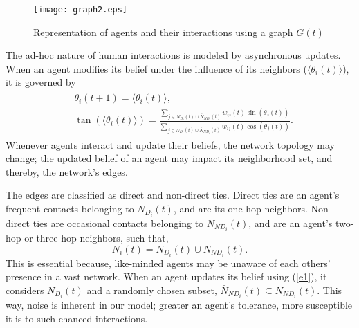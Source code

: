 \documentclass[letterpaper,english,11pt]{article}
\begin{document}
\begin{figure}[t!]	
	\centering
	\texttt{[image: graph2.eps]}
	\vspace{-5pt}
	\caption{Representation of agents and their interactions using a graph $G(t)$}	
	\label{fig2b}\vspace{-15pt}
\end{figure}

The ad-hoc nature of human interactions is modeled by asynchronous updates. When an agent modifies its belief under the influence of its neighbors ($\langle \theta_{i}(t)\rangle$), it is governed by 
\begin{align}\label{e1}
\begin{split}
&\theta_{i}(t+1) = \langle \theta_{i}(t)\rangle,\\ 
& \tan(\langle \theta_{i}(t)\rangle)=\frac{\sum\limits_{j\in N_{D_{i}}(t)\cup \bar{N}_{ND_{i}}(t)} w_{ij}(t) \sin(\theta_{j}(t))}{ \sum\limits_{j\in N_{D_{i}}(t)\cup \bar{N}_{ND_{i}}(t)}w_{ij}(t) \cos(\theta_{j}(t))}.
\end{split}
\end{align}
Whenever agents interact and update their beliefs, the network topology may change; the updated belief of an agent may impact its neighborhood set, and thereby, the network's edges. 


The edges are classified as direct and non-direct ties. Direct ties are an agent's frequent contacts belonging to $N_{D_{i}}(t)$, and are its one-hop neighbors. Non-direct ties are occasional contacts belonging to $N_{ND_i}(t)$, and are an agent's two-hop or three-hop neighbors, such that,
\begin{equation}
N_{i}(t) = N_{D_{i}}(t)\cup N_{ND_{i}}(t).
\end{equation} 
This is essential because, like-minded agents may be unaware of each others' presence in a vast network. When an agent updates its belief using (\ref{e1}), it considers $N_{D_{i}}(t)$ and a randomly chosen subset, $\bar{N}_{ND_{i}}(t) \subseteq N_{ND_{i}}(t)$. This way, noise is inherent in our model; greater an agent's tolerance, more susceptible it is to such chanced interactions.
\end{document}

